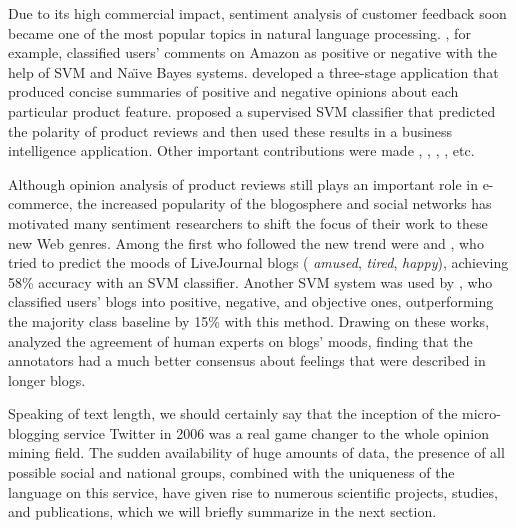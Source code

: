 Due to its high commercial impact, sentiment analysis of customer
feedback soon became one of the most popular topics in natural
language processing.  \citet{Dave:03}, for example, classified users'
comments on Amazon as positive or negative with the help of SVM and
Na\"{\i}ve Bayes systems.  \citet{Hu:04} developed a three-stage
application that produced concise summaries of positive and negative
opinions about each particular product feature.  \citet{Funk:08}
proposed a supervised SVM classifier that predicted the polarity of
product reviews and then used these results in a business intelligence
application.  Other important contributions were made
\citet{Popescu:05}, \citet{Ding:09}, \citet{Wei:10},
\citet{Mukherjee:12}, etc.


Although opinion analysis of product reviews still plays an important
role in e-commerce, the increased popularity of the blogosphere and
social networks has motivated many sentiment researchers to shift the
focus of their work to these new Web genres.  Among the first who
followed the new trend were \citet{Mishne:05} and \citet{Mishne:07},
who tried to predict the moods of LiveJournal blogs (\eg{}
\emph{amused}, \emph{tired}, \emph{happy}), achieving 58\% accuracy
with an SVM classifier.
Another SVM system was used by \citet{Chesley:06}, who classified
users' blogs into positive, negative, and objective ones,
outperforming the majority class baseline by 15\% with this method.
Drawing on these works, \citet{Gill:08} analyzed the agreement of
human experts on blogs' moods, finding that the annotators had a much
better consensus about feelings that were described in longer blogs.


Speaking of text length, we should certainly say that the inception of
the micro-blogging service Twitter in 2006 was a real game changer to
the whole opinion mining field.  The sudden availability of huge
amounts of data, the presence of all possible social and national
groups, combined with the uniqueness of the language on this service,
have given rise to numerous scientific projects, studies, and
publications, which we will briefly summarize in the next section.

